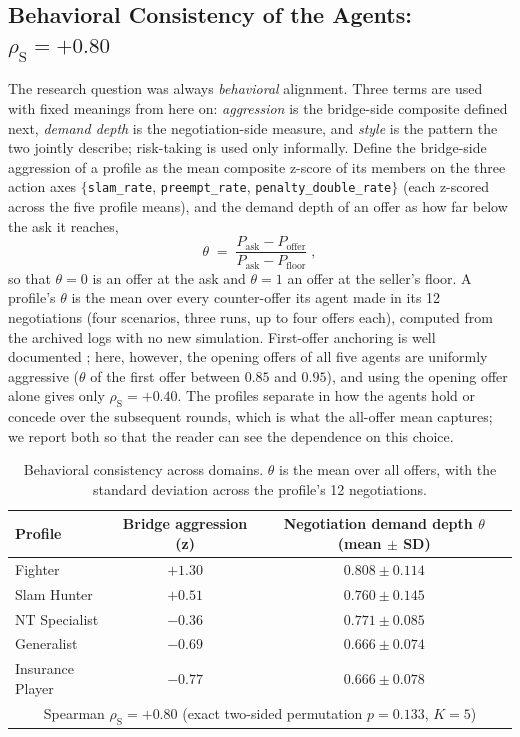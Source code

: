 \documentclass[runningheads]{llncs}
\newcommand{\rhoS}{\rho_{\mathrm{S}}}
\begin{document}
\subsection{Behavioral Consistency of the Agents: $\rhoS = +0.80$}\label{sec:style}

The research question was always \emph{behavioral} alignment. Three
terms are used with fixed meanings from here on: \emph{aggression} is
the bridge-side composite defined next, \emph{demand depth} is the
negotiation-side measure, and \emph{style} is the pattern the two
jointly describe; risk-taking is used only informally. Define the
bridge-side aggression of a profile as the mean composite z-score of
its members on the three action axes $\{$\texttt{slam\_rate},
\texttt{preempt\_rate}, \texttt{penalty\_double\_rate}$\}$ (each
z-scored across the five profile means), and the demand depth of an
offer as how far below the ask it reaches,
\begin{equation}
\theta \;=\; \frac{P_{\mathrm{ask}} - P_{\mathrm{offer}}}
{P_{\mathrm{ask}} - P_{\mathrm{floor}}}\;,
\label{eq:theta}
\end{equation}
so that $\theta=0$ is an offer at the ask and $\theta=1$ an offer at the
seller's floor. A profile's $\theta$ is the mean over every
counter-offer its agent made in its 12 negotiations (four scenarios,
three runs, up to four offers each), computed from the archived logs
with no new simulation. First-offer anchoring is well documented
\cite{galinsky2001first}; here, however, the opening offers of all five
agents are uniformly aggressive ($\theta$ of the first offer between
$0.85$ and $0.95$), and using the opening offer alone gives only
$\rhoS=+0.40$. The profiles separate in how the agents hold or concede
over the subsequent rounds, which is what the all-offer mean captures;
we report both so that the reader can see the dependence on this
choice.

\begin{table}[h]
\centering\small
\caption{Behavioral consistency across domains. $\theta$ is the mean
over all offers, with the standard deviation across the profile's 12
negotiations.}
\label{tab:style}
\begin{tabular}{lcc}
\toprule
Profile & Bridge aggression (z) & Negotiation demand depth $\theta$ (mean $\pm$ SD)\\
\midrule
Fighter          & $+1.30$ & $0.808 \pm 0.114$\\
Slam Hunter      & $+0.51$ & $0.760 \pm 0.145$\\
NT Specialist    & $-0.36$ & $0.771 \pm 0.085$\\
Generalist       & $-0.69$ & $0.666 \pm 0.074$\\
Insurance Player & $-0.77$ & $0.666 \pm 0.078$\\
\midrule
\multicolumn{3}{c}{Spearman $\rhoS = \mathbf{+0.80}$ \; (exact two-sided permutation $p=0.133$, $K=5$)}\\
\bottomrule
\end{tabular}
\end{table}
\end{document}
